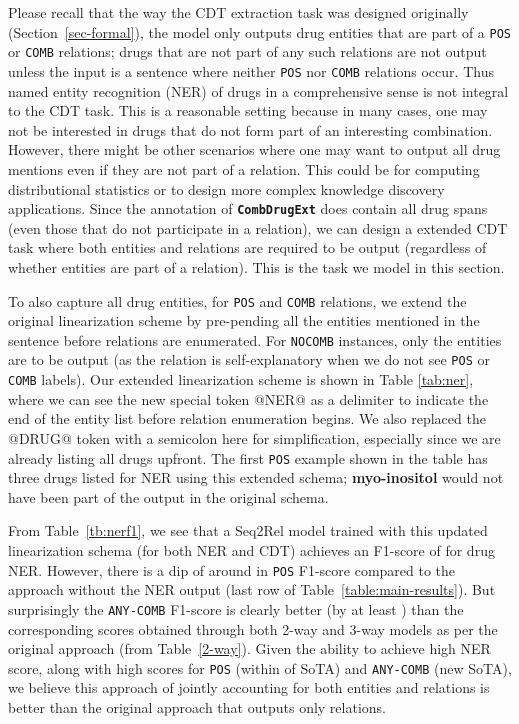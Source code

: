 \documentclass[conference]{IEEEtran}
\begin{document}
Please recall that the way the CDT extraction task was designed originally (Section~\ref{sec-formal}), the model only outputs drug entities that are part of a \texttt{POS} or \texttt{COMB} relations; drugs that are not part of any such relations are not output unless the input is a sentence where neither \texttt{POS} nor \texttt{COMB} relations occur. Thus named entity recognition (NER) of drugs in a comprehensive sense is not integral to the CDT task. This is a reasonable setting because in many cases, one may not be interested in drugs that do not form part of an interesting combination. However, there might be other scenarios where one may want to output all drug mentions even if they are not part of a relation. This could be for computing distributional statistics or to design more complex knowledge discovery applications. Since the annotation of \textbf{\texttt{CombDrugExt}} does contain all drug spans (even those that do not participate in a relation), we can design a extended CDT task where both entities and relations are required to be output (regardless of whether entities are part of a relation). This is the task we model in this section.

To also capture all drug entities, for \texttt{POS} and \texttt{COMB} relations, we extend the original linearization scheme by pre-pending all the entities mentioned in the sentence before relations are enumerated. For \texttt{NOCOMB} instances, only the entities are to be output (as the relation is self-explanatory when we do not see \texttt{POS} or \texttt{COMB} labels). Our extended   linearization scheme is shown in Table \ref{tab:ner}, where we can see the new special token @NER@ as a delimiter to indicate the end of the entity list before relation enumeration begins. We also replaced the @DRUG@ token with a semicolon here for simplification, especially since we are already listing all drugs upfront. The first \texttt{POS} example shown in the table has three drugs listed for NER using this extended schema;  \textbf{myo-inositol} would not have been part of the output in the original schema. 



From Table~\ref{tb:nerf1}, we see that a Seq2Rel model trained with this updated linearization schema (for both NER and CDT) achieves an F1-score of  for drug NER.  
However, there is a dip of around  in \texttt{POS} F1-score compared to the approach without the NER output (last row of Table~\ref{table:main-results}). But surprisingly the \texttt{ANY-COMB} F1-score is clearly better (by at least ) than the corresponding scores obtained through both 2-way and 3-way models as per the original approach (from Table~\ref{2-way}). Given the ability to achieve high NER score, along with high scores for \texttt{POS} (within  of SoTA) and \texttt{ANY-COMB} (new SoTA), we believe this approach of jointly accounting for both entities and relations is better than the original approach that outputs only relations. 
\end{document}
